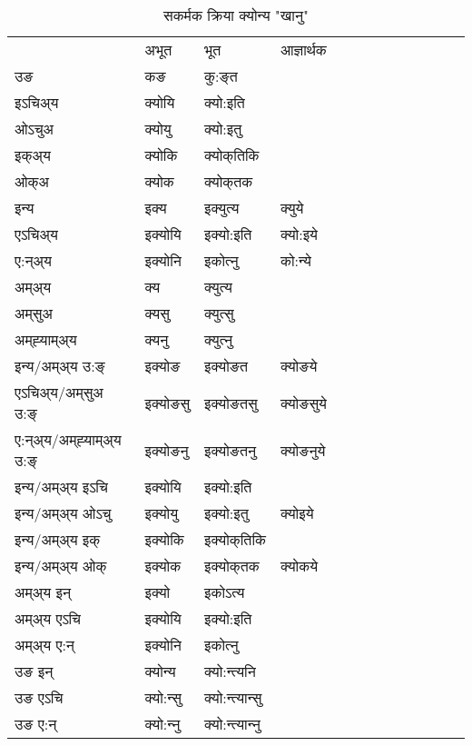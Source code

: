 \begin{table}[H]
\centering
\caption{\label{a.vt} सकर्मक क्रिया  क्योन्य  "खानु"  }
\begin{tabular}{l|l|l|l|l|l|l|l|l|l|l|l|l}  \toprule
&अभूत & भूत & आज्ञार्थक \\ 
उङ &कङ &कु:ङ्‌त \\ 
इऽचिअ्य &क्योयि &क्यो:इति   \\ 
ओऽचुअ &क्योयु &क्यो:इतु   \\ 
इक्अ्य &क्योकि &क्योक्‌तिकि   \\ 
ओक्अ &क्योक &क्योक्‌तक   \\ 
इन्य & इक्य & इक्युत्य &क्युये  \\ 
एऽचिअ्य & इक्योयि & इक्यो:इति &क्यो:इये    \\ 
ए:न्अ्य & इक्योनि  & इकोत्‍नु &को:न्ये  \\ 
अम्अ्य & क्य & क्युत्य   \\ 
अम्‌सुअ & क्यसु & क्युत्सु     \\ 
अम्‌ह्‍याम्अ्य & क्यनु  & क्युत्‍नु \\ 
\midrule
इन्य/अम्अ्य उ:ङ्‌&इक्योङ &इक्योङत &क्योङये \\ 
एऽचिअ्य/अम्‌सुअ उ:ङ्‌ &इक्योङसु &इक्योङतसु &क्योङसुये \\ 
ए:न्अ्य/अम्‌ह्‍याम्अ्य उ:ङ्‌ &इक्योङनु &इक्योङतनु &क्योङनुये \\ 
इन्य/अम्अ्य इऽचि &इक्योयि &इक्यो:इति    \\ 
इन्य/अम्अ्य ओऽचु &इक्योयु &इक्यो:इतु  &क्योइये  \\ 
इन्य/अम्अ्य इक् &इक्योकि &इक्योक्‌तिकि   \\ 
इन्य/अम्अ्य ओक् &इक्योक &इक्योक्‌तक  &क्योकये  \\ 
अम्अ्य इन् & इक्यो & इकोऽत्य   \\ 
अम्अ्य एऽचि & इक्योयि & इक्यो:इति     \\ 
अम्अ्य ए:न् & इक्योनि  & इकोत्‍नु  \\ 
\midrule
उङ इन् & क्योन्य  & क्यो:न्त्यनि  \\ 
उङ एऽचि & क्यो:न्सु  & क्यो:न्त्यान्सु   \\ 
उङ ए:न्& क्यो:न्‍नु  & क्यो:न्त्यान्‍नु   \\ 
\bottomrule
\end{tabular}
\end{table}


